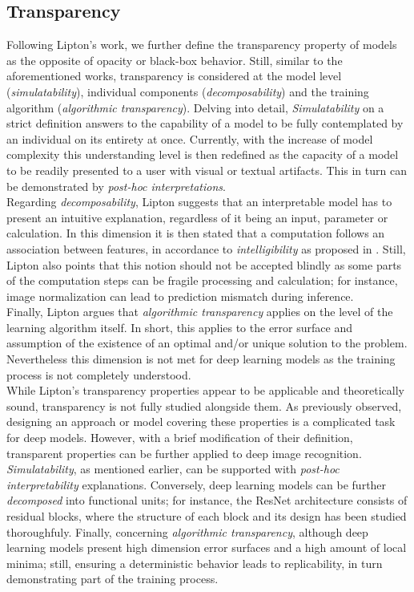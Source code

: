 \subsection{Transparency}
\label{rel:sub_transp}
Following Lipton's work, we further define the transparency property of models as the opposite of 
opacity or black-box behavior. Still, similar to the aforementioned works, transparency is 
considered at the model level (\emph{simulatability}), individual components 
(\emph{decomposability}) and the training algorithm (\emph{algorithmic transparency}). Delving into 
detail, \emph{Simulatability} on a strict definition answers to the capability of a model to be 
fully contemplated by an individual on its entirety at once. Currently, with the increase of model 
complexity this understanding level is then redefined as the capacity of a model to be readily 
presented to a user with visual or textual artifacts. This in turn can be demonstrated by 
\emph{post-hoc interpretations}.\\

\noindent Regarding \emph{decomposability}, Lipton suggests that an interpretable model has to present 
an intuitive explanation, regardless of it being an input, parameter or calculation. In this 
dimension it is then stated that a computation follows an association between features, in 
accordance to \emph{intelligibility} as proposed in \autocite{lou2012intelligible}. Still, Lipton 
also points that this notion should not be accepted blindly as some parts of the computation steps 
can be fragile processing and calculation; for instance, image normalization can lead to prediction 
mismatch during inference.\\

\noindent Finally, Lipton argues that \emph{algorithmic transparency} applies on the level of the 
learning algorithm itself. In short, this applies to the error surface and assumption of the 
existence of an optimal and/or unique solution to the problem. Nevertheless this dimension is not 
met for deep learning models as the training process is not completely understood.\\

\noindent While Lipton's transparency properties appear to be applicable and theoretically sound, 
transparency is not fully studied alongside them. As previously observed, designing an approach or 
model covering these properties is a complicated task for deep models. However, with a brief 
modification of their definition, transparent properties can be further applied to deep image 
recognition. \emph{Simulatability}, as mentioned earlier,  can be supported with \emph{post-hoc 
interpretability} explanations. Conversely, deep learning models can be further 
\emph{decomposed} into functional units; for instance, the ResNet architecture consists of
residual blocks, where the structure of each block and its design has been studied thoroughfuly. 
Finally, concerning \emph{algorithmic transparency}, although deep learning models present high 
dimension error surfaces and a high amount of local minima; still, ensuring a deterministic 
behavior leads to replicability, in turn demonstrating part of the training process.\\

